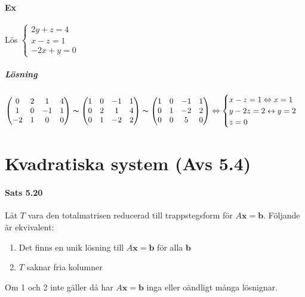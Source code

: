 \paragraph{Ex} Lös $\begin{cases}
    2y+z=4\\
    x-z=1\\
    -2x+y=0
\end{cases}$
\subparagraph{Lösning}
\begin{equation*}
    \begin{pmatrix}
        0&2&1&4\\
        1&0&-1&1\\
        -2&1&0&0
    \end{pmatrix}
    \thicksim
    \begin{pmatrix}
        1&0&-1&1\\
        0&2&1&4\\
        0&1&-2&2
    \end{pmatrix}
    \thicksim
    \begin{pmatrix}
        1&0&-1&1\\
        0&1&-2&2\\
        0&0&5&0
    \end{pmatrix}
    \Leftrightarrow
    \begin{cases}
        x-z=1\Leftrightarrow x=1\\
        y-2z=2\leftrightarrow y=2\\
        z=0
    \end{cases}
\end{equation*}

\section{Kvadratiska system (Avs 5.4)}
\paragraph{Sats 5.20} Låt $T$ vara den totalmatrisen reducerad till trappstegsform för $A\bm{x}=\bm{b}$.
Följande är ekvivalent:
\begin{enumerate}
    \item Det finns en unik lösning till $A\bm{x}=\bm{b}$ för alla $\bm{b}$
    \item $T$ saknar fria kolumner
\end{enumerate}
Om 1 och 2 inte gäller då har $A\bm{x}=\bm{b}$ inga eller oändligt många lösnignar.


